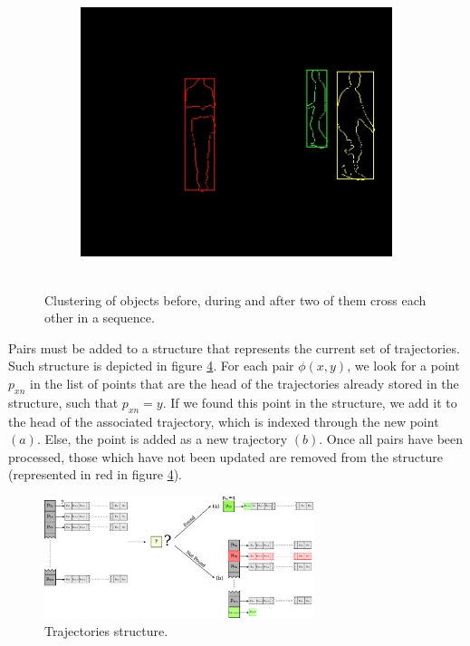\begin{figure}[t]
\begin{subfigure}[b]{0.32\textwidth}
		\caption{~}
                \label{fig:cp02_cluster2}
        \end{subfigure}%
        ~ %
        \begin{subfigure}[b]{0.32\textwidth}
                \centering
                \includegraphics[width=\textwidth]{fig3.jpg}
                \caption{~}
                \label{fig:cp02_cluster3}
        \end{subfigure}%
        \caption{Clustering of objects before, during and after two of them cross each other in a sequence.}\label{fig:cp02_clusterization_output}
\end{figure}

Pairs must be added to a structure that represents the current set of trajectories. Such structure is depicted in figure \ref{fig:cp02_trajectories_structure}. For each pair $\phi(x,y)$, we look for a point $p_{xn}$ in the list of points that are the head of the trajectories already stored in the structure, such that $p_{xn} = y$. If we found this point in the structure, we add it to the head of the associated trajectory, which is indexed through the new point $(a)$. Else, the point is added as a new trajectory $(b)$. Once all pairs have been processed, those which have not been updated are removed from the structure (represented in red in figure \ref{fig:cp02_trajectories_structure}).

\begin{figure}[h]
  \centering
  \includegraphics[width=0.7\textwidth, trim=0 0 0 0,clip]{fig4.pdf}
  \caption{Trajectories structure.}
  \label{fig:cp02_trajectories_structure}
\end{figure}

